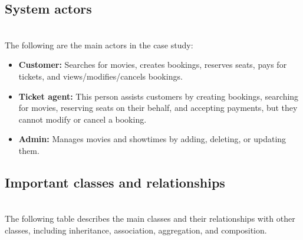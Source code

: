 \subsection{System actors}\label{lJ92a1xM1DB1BY8-OnHlR}
\\
The following are the main actors in the case study:

\begin{itemize}
\item
\protect{}\label{TOABnXFGHcxLz1L-wvN_h}
\textbf{Customer:} Searches for movies, creates bookings, reserves seats, pays for tickets, and views/modifies/cancels bookings.
\item
\protect{}\label{H_6xOrYFFZu4JqP5oqZEZ}
\textbf{Ticket agent:} This person assists customers by creating bookings, searching for movies, reserving seats on their behalf, and accepting payments, but they cannot modify or cancel a booking.
\item
\protect{}\label{mhmRCIfO2_3Tv50z6HKnu}
\textbf{Admin:} Manages movies and showtimes by adding, deleting, or updating them.
\end{itemize}

\subsection{Important classes and relationships}\label{3Ohj53U1N8nvmWwEIMtG_}
\\
The following table describes the main classes and their relationships with other classes, including inheritance, association, aggregation, and composition.

